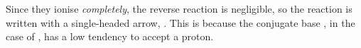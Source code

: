 			Since they ionise \textit{completely}, the reverse reaction is negligible, so the reaction is written with a single-headed
			arrow, \ch{->}. This is because the conjugate base \ch{\chlorine-}, in the case of , has a low tendency to
			accept a proton.


















